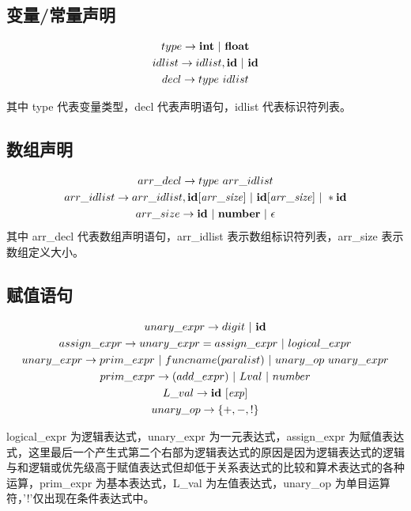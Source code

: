 \documentclass[UTF8,a4paper,10pt]{ctexart}
\begin{document}
\subsection{变量/常量声明}
\begin{gather*}
  type \rightarrow \rm\bf{int\ |\ float}\\
  idlist \rightarrow idlist, \rm\bf{id\ |\ id}\\
  decl \rightarrow type\ idlist
\end{gather*}

其中 type 代表变量类型，decl 代表声明语句，idlist 代表标识符列表。

\subsection{数组声明}
\begin{gather*}
  arr\_decl\rightarrow type\ arr\_idlist\\
  arr\_idlist\rightarrow arr\_idlist,\rm\bf{id}\it{[arr\_size]}\ |\ \rm\bf{id}\it{[arr\_size]}\ |\ *\rm\bf{id} \\
  arr\_size\rightarrow \rm\bf{id}\ |\ number\ |\ \epsilon
\end{gather*}
其中 arr\_decl 代表数组声明语句，arr\_idlist 表示数组标识符列表，arr\_size 表示数组定义大小。

\subsection{赋值语句}
\begin{gather*}
  unary\_expr \rightarrow digit\ |\ \rm\bf{id}\\
  assign\_expr \rightarrow unary\_expr=assign\_expr\ |\ logical\_expr\\
  unary\_expr\rightarrow prim\_expr\ |\ funcname(paralist)\ |\ unary\_op\ unary\_expr\\
  prim\_expr\rightarrow (add\_expr)\ |\ Lval\ |\ number\\
  L\_val\rightarrow \rm\bf{id}\ \it{[exp]}\\
  unary\_op \rightarrow \rm\bf{\{+,-,!\}}
\end{gather*}

logical\_expr 为逻辑表达式，unary\_expr 为一元表达式，assign\_expr 为赋值表达式，这里最后一个产生式第二个右部为逻辑表达式的原因是因为逻辑表达式的逻辑与和逻辑或优先级高于赋值表达式但却低于关系表达式的比较和算术表达式的各种运算，prim\_expr 为基本表达式，L\_val 为左值表达式，unary\_op 为单目运算符，'!'仅出现在条件表达式中。
\end{document}
